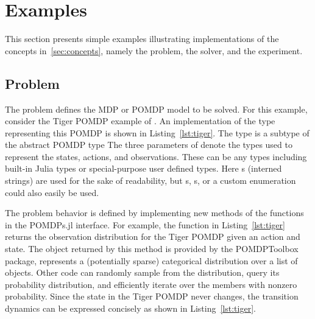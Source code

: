 \section{Examples}

This section presents simple examples illustrating implementations of the concepts in~\cref{sec:concepts}, namely the problem, the solver, and the experiment. 

\lstset{escapechar=@,style=customjulia}

\subsection{Problem}

The problem defines the MDP or POMDP model to be solved.
For this example, consider the Tiger POMDP example of \citet{kaelbling1998planning}.
An implementation of the type representing this POMDP is shown in Listing~\ref{lst:tiger}.
The  type is a subtype of the abstract {\small\ttfamily POMDP} type 
The three parameters of  denote the types used to represent the states, actions, and observations.
These can be any types including built-in Julia types or special-purpose user defined types.
Here s (interned strings) are used for the sake of readability, but s, s, or a custom enumeration could also easily be used.
 
The problem behavior is defined by implementing new methods of the functions in the POMDPs.jl interface.
For example, the  function in Listing~\ref{lst:tiger} returns the observation distribution for the Tiger POMDP given an action and state.
The  object returned by this method is provided by the POMDPToolbox package, represents a (potentially sparse) categorical distribution over a list of objects.
Other code can randomly sample from the  distribution, query its probability distribution, and efficiently iterate over the members with nonzero probability.
Since the state in the Tiger POMDP never changes, the transition dynamics can be expressed concisely as shown in Listing~\ref{lst:tiger}.

